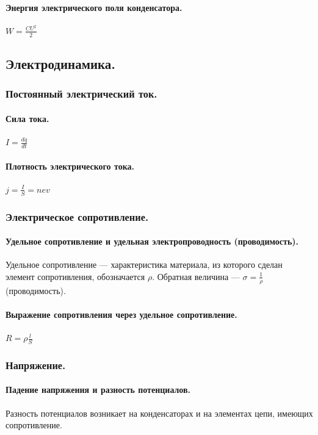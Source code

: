 \documentclass{article}
\begin{document}
            \paragraph{Энергия электрического поля конденсатора.}
                \(W = \frac{CU^2}{2}\)
        \subsection{Электродинамика.}
        \subsubsection{Постоянный электрический ток.}
            \paragraph{Сила тока.}
                \(I = \frac{dq}{dt}\)
            \paragraph{Плотность электрического тока.}
                \(j = \frac{I}{S} = nev\)
        \subsubsection{Электрическое сопротивление.}
            \paragraph{Удельное сопротивление и удельная электропроводность (проводимость).}
                Удельное сопротивление --- характеристика материала, из которого сделан элемент сопротивления, обозначается \(\rho\). Обратная величина --- \(\sigma = \frac{1}{\rho}\)(проводимость).
                
            \paragraph{Выражение сопротивления через удельное сопротивление.}
                \(R = \rho\frac{l}{S}\)
        \subsubsection{Напряжение.}
            \paragraph{Падение напряжения и разность потенциалов.}
                Разность потенциалов возникает на конденсаторах и на элементах цепи, имеющих сопротивление.
\end{document}
